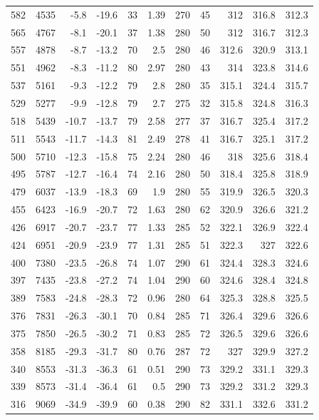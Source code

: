 \documentclass{article}
\begin{document}
\begin{longtable}{r|r|r|r|r|r|r|r|r|r|r}
582 & 4535 & -5.8 & -19.6 & 33 & 1.39 & 270 & 45 & 312 & 316.8 & 312.3 \\
565 & 4767 & -8.1 & -20.1 & 37 & 1.38 & 280 & 50 & 312 & 316.7 & 312.3 \\
557 & 4878 & -8.7 & -13.2 & 70 & 2.5 & 280 & 46 & 312.6 & 320.9 & 313.1 \\
551 & 4962 & -8.3 & -11.2 & 80 & 2.97 & 280 & 43 & 314 & 323.8 & 314.6 \\
537 & 5161 & -9.3 & -12.2 & 79 & 2.8 & 280 & 35 & 315.1 & 324.4 & 315.7 \\
529 & 5277 & -9.9 & -12.8 & 79 & 2.7 & 275 & 32 & 315.8 & 324.8 & 316.3 \\
518 & 5439 & -10.7 & -13.7 & 79 & 2.58 & 277 & 37 & 316.7 & 325.4 & 317.2 \\
511 & 5543 & -11.7 & -14.3 & 81 & 2.49 & 278 & 41 & 316.7 & 325.1 & 317.2 \\
500 & 5710 & -12.3 & -15.8 & 75 & 2.24 & 280 & 46 & 318 & 325.6 & 318.4 \\
495 & 5787 & -12.7 & -16.4 & 74 & 2.16 & 280 & 50 & 318.4 & 325.8 & 318.9 \\
479 & 6037 & -13.9 & -18.3 & 69 & 1.9 & 280 & 55 & 319.9 & 326.5 & 320.3 \\
455 & 6423 & -16.9 & -20.7 & 72 & 1.63 & 280 & 62 & 320.9 & 326.6 & 321.2 \\
426 & 6917 & -20.7 & -23.7 & 77 & 1.33 & 285 & 52 & 322.1 & 326.9 & 322.4 \\
424 & 6951 & -20.9 & -23.9 & 77 & 1.31 & 285 & 51 & 322.3 & 327 & 322.6 \\
400 & 7380 & -23.5 & -26.8 & 74 & 1.07 & 290 & 61 & 324.4 & 328.3 & 324.6 \\
397 & 7435 & -23.8 & -27.2 & 74 & 1.04 & 290 & 60 & 324.6 & 328.4 & 324.8 \\
389 & 7583 & -24.8 & -28.3 & 72 & 0.96 & 280 & 64 & 325.3 & 328.8 & 325.5 \\
376 & 7831 & -26.3 & -30.1 & 70 & 0.84 & 285 & 71 & 326.4 & 329.6 & 326.6 \\
375 & 7850 & -26.5 & -30.2 & 71 & 0.83 & 285 & 72 & 326.5 & 329.6 & 326.6 \\
358 & 8185 & -29.3 & -31.7 & 80 & 0.76 & 287 & 72 & 327 & 329.9 & 327.2 \\
340 & 8553 & -31.3 & -36.3 & 61 & 0.51 & 290 & 73 & 329.2 & 331.1 & 329.3 \\
339 & 8573 & -31.4 & -36.4 & 61 & 0.5 & 290 & 73 & 329.2 & 331.2 & 329.3 \\
316 & 9069 & -34.9 & -39.9 & 60 & 0.38 & 290 & 82 & 331.1 & 332.6 & 331.2 \\

\end{longtable}
\end{document}
